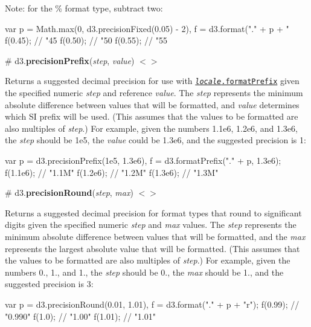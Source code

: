 Note\+: for the {\ttfamily \%} format type, subtract two\+:


\begin{DoxyCode}
var p = Math.max(0, d3.precisionFixed(0.05) - 2),
    f = d3.format("." + p + "%
f(0.45); // "45%
f(0.50); // "50%
f(0.55); // "55%
\end{DoxyCode}


\label{_precisionPrefix}%
\# d3.{\bfseries precision\+Prefix}({\itshape step}, {\itshape value}) \href{https://github.com/d3/d3-format/blob/master/src/precisionPrefix.js}{\tt $<$$>$}

Returns a suggested decimal precision for use with \href{#locale_formatPrefix}{\tt {\itshape locale}.format\+Prefix} given the specified numeric {\itshape step} and reference {\itshape value}. The {\itshape step} represents the minimum absolute difference between values that will be formatted, and {\itshape value} determines which SI prefix will be used. (This assumes that the values to be formatted are also multiples of {\itshape step}.) For example, given the numbers 1.\+1e6, 1.\+2e6, and 1.\+3e6, the {\itshape step} should be 1e5, the {\itshape value} could be 1.\+3e6, and the suggested precision is 1\+:


\begin{DoxyCode}
var p = d3.precisionPrefix(1e5, 1.3e6),
    f = d3.formatPrefix("." + p, 1.3e6);
f(1.1e6); // "1.1M"
f(1.2e6); // "1.2M"
f(1.3e6); // "1.3M"
\end{DoxyCode}


\label{_precisionRound}%
\# d3.{\bfseries precision\+Round}({\itshape step}, {\itshape max}) \href{https://github.com/d3/d3-format/blob/master/src/precisionRound.js}{\tt $<$$>$}

Returns a suggested decimal precision for format types that round to significant digits given the specified numeric {\itshape step} and {\itshape max} values. The {\itshape step} represents the minimum absolute difference between values that will be formatted, and the {\itshape max} represents the largest absolute value that will be formatted. (This assumes that the values to be formatted are also multiples of {\itshape step}.) For example, given the numbers 0., 1., and 1., the {\itshape step} should be 0., the {\itshape max} should be 1., and the suggested precision is 3\+:


\begin{DoxyCode}
var p = d3.precisionRound(0.01, 1.01),
    f = d3.format("." + p + "r");
f(0.99); // "0.990"
f(1.0);  // "1.00"
f(1.01); // "1.01"
\end{DoxyCode}



